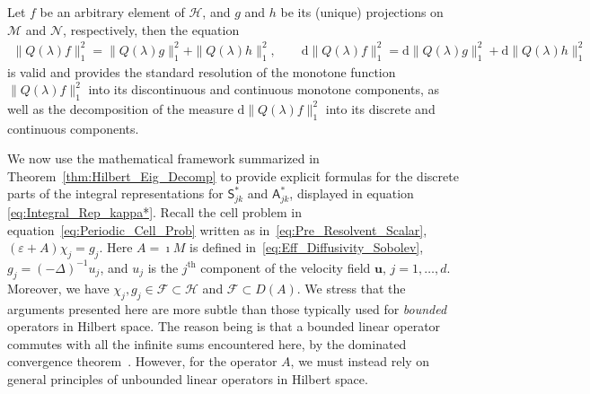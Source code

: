 \documentclass[leqno,onefignum,onetabnum]{siamltex1213}
\newcommand{\thmref}[1]{Theorem~\ref{#1}}
\renewcommand{\d}{\mathrm{d}}
\newcommand{\Mc}{\mathcal{M}}
\newcommand{\Nc}{\mathcal{N}}
\newcommand{\Sm}{\mathsf{S}}
\newcommand{\Am}{\mathsf{A}}
\newcommand{\Hs}{\mathscr{H}}
\newcommand{\Fs}{\mathscr{F}}
\newcommand{\vecu}{\boldsymbol{u}}
\begin{document}
\begin{theorem}
Let $f$ be an arbitrary element of $\Hs$, and $g$ and $h$ be its (unique)
projections on $\Mc$ and $\Nc$, respectively, then the equation
%
\begin{align}\label{eq:Disc_Cont_Measures}
  \|Q(\lambda)f\|_1^2=\|Q(\lambda)g\|_1^2+\|Q(\lambda)h\|_1^2, \qquad
  \d\|Q(\lambda)f\|_1^2=\d\|Q(\lambda)g\|_1^2+\d\|Q(\lambda)h\|_1^2
\end{align}
%
is valid and provides the standard resolution of the monotone function
$\|Q(\lambda)f\|_1^2$ into its discontinuous and continuous monotone
components, as well as the decomposition of the measure
$\d\|Q(\lambda)f\|_1^2$ into its discrete and continuous components.  
\end{theorem}
%






We now use the mathematical framework summarized in
\thmref{thm:Hilbert_Eig_Decomp} to provide explicit formulas for the
discrete parts of the integral representations for $\Sm^*_{jk}$
and $\Am^*_{jk}$, displayed in equation
\eqref{eq:Integral_Rep_kappa*}. Recall the cell problem
in equation~\eqref{eq:Periodic_Cell_Prob} written as
in~\eqref{eq:Pre_Resolvent_Scalar}, $(\varepsilon+A)\chi_j=g_j$. Here $A=\imath M$ 
is defined in~\eqref{eq:Eff_Diffusivity_Sobolev}, $g_j=(-\Delta)^{-1}u_j$,
and $u_j$ is the $j^{\text{th}}$ component of the velocity field
$\vecu$, $j=1,\ldots,d$. Moreover, we have $\chi_j,g_j\in\Fs\subset\Hs$ and $\Fs\subset
D(A)$. We stress that the arguments presented here are more subtle
than those typically used for \emph{bounded} operators in Hilbert
space. The reason being is that a bounded linear operator commutes with all
the infinite sums encountered here, by the dominated convergence
theorem~\cite{Folland:99:RealAnalysis}. However, for the operator $A$,
we must instead rely on general principles of unbounded linear operators in
Hilbert space.  
\end{document}
